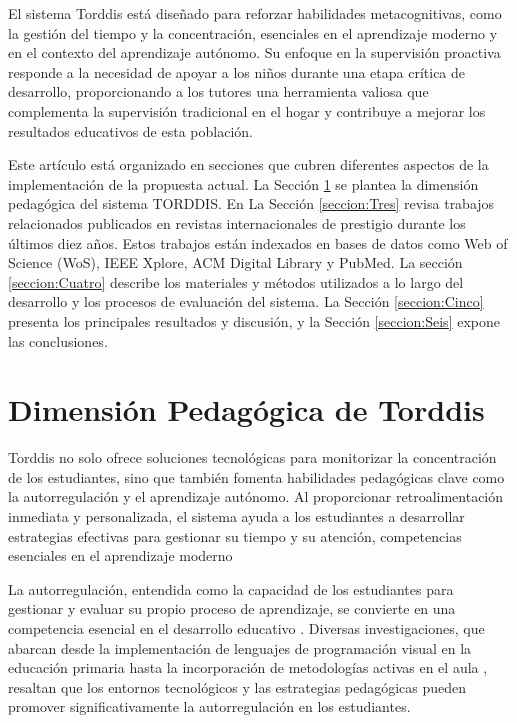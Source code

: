 \documentclass[a4paper,fleqn]{cas-sc}
\begin{document}
		El sistema Torddis está diseñado para reforzar habilidades metacognitivas, como la gestión del tiempo y la concentración, esenciales en el aprendizaje moderno y en el contexto del aprendizaje autónomo. Su enfoque en la supervisión proactiva responde a la necesidad de apoyar a los niños durante una etapa crítica de desarrollo, proporcionando a los tutores una herramienta valiosa que complementa la supervisión tradicional en el hogar y contribuye a mejorar los resultados educativos de esta población.
		
		Este artículo está organizado en secciones que cubren diferentes aspectos de la implementación de la propuesta actual. La Sección \ref{seccion:Dos} se plantea la dimensión pedagógica del sistema TORDDIS. En La Sección \ref{seccion:Tres} revisa trabajos relacionados publicados en revistas internacionales de prestigio durante los últimos diez años. Estos trabajos están indexados en bases de datos como Web of Science (WoS), IEEE Xplore, ACM Digital Library y PubMed. La sección \ref{seccion:Cuatro} describe los materiales y métodos utilizados a lo largo del desarrollo y los procesos de evaluación del sistema. La Sección \ref{seccion:Cinco} presenta los principales resultados y discusión, y la Sección \ref{seccion:Seis} expone las conclusiones.
		
	\section{Dimensión Pedagógica de Torddis}
	\label{seccion:Dos}	
		Torddis no solo ofrece soluciones tecnológicas para monitorizar la concentración de los estudiantes, sino que también fomenta habilidades pedagógicas clave como la autorregulación y el aprendizaje autónomo. Al proporcionar retroalimentación inmediata y personalizada, el sistema ayuda a los estudiantes a desarrollar estrategias efectivas para gestionar su tiempo y su atención, competencias esenciales en el aprendizaje moderno \cite{Loh2025Plugging}
		
		La autorregulación, entendida como la capacidad de los estudiantes para gestionar y evaluar su propio proceso de aprendizaje, se convierte en una competencia esencial en el desarrollo educativo \cite{Palioura2025Storylling}. Diversas investigaciones, que abarcan desde la implementación de lenguajes de programación visual en la educación primaria \citep{SaezLopez2016Visual} hasta la incorporación de metodologías activas en el aula \citep{Mohamed2018Implementing}, resaltan que los entornos tecnológicos y las estrategias pedagógicas pueden promover significativamente la autorregulación en los estudiantes.
		
\end{document}

